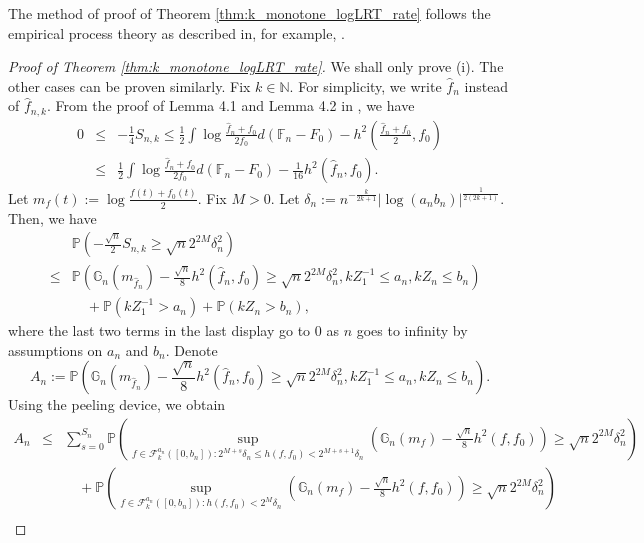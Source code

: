 \documentclass[12pt,letterpaper, twoside, openany]{article}
\theoremstyle{plain}
\begin{document}
The method of proof of Theorem \ref{thm:k_monotone_logLRT_rate} follows the empirical process theory as described in, for example, \cite{van2000empirical}.
\begin{proof}[Proof of Theorem \ref{thm:k_monotone_logLRT_rate}]
We shall only prove (i). The other cases can be proven similarly. Fix $k \in \mathbb{N}$. For simplicity, we write $\hat{f}_n$ instead of $\hat{f}_{n,k}$. From the proof of Lemma 4.1 and Lemma 4.2 in \cite{van2000empirical}, we have
\begin{eqnarray*}
	0 & \leq  &- \frac{1}{4} S_{n, k} \leq \frac{1}{2} \int \log \frac{\hat{f}_{n} + f_0}{2f_0} d (\mathbb{F}_n - F_0) -  h^2 \left( \frac{\hat{f}_n + f_0}{2}, f_0 \right) \\
	& \leq & \frac{1}{2} \int \log \frac{\hat{f}_{n} + f_0}{2f_0} d (\mathbb{F}_n - F_0) - \frac{1}{16} h^2 \left(\hat{f}_n, f_0 \right).
\end{eqnarray*}
Let $m_{f}(t) := \log \frac{f(t) + f_0(t)}{2}$. Fix $M > 0$. Let $\delta_n := n^{-\frac{k}{2k+1}} | \log (a_n b_n)|^{\frac{1}{2(2k+1)}}$. Then, we have
\begin{eqnarray*}
	&& 	\mathbb{P} \left(  - \frac{\sqrt{n}}{2} S_{n, k} \geq \sqrt{n} 2^{2M} \delta^2_n \right) \\
	&\leq & \mathbb{P} \left( \mathbb{G}_n(m_{\hat{f}_n}) - \frac{\sqrt{n}}{8} h^2 ( \hat{f}_n, f_0 ) \geq \sqrt{n} 2^{2M} \delta^2_n, kZ^{-1}_1 \leq a_n, k Z_n \leq b_n \right)  \\
	&& \quad + \mathbb{P}(kZ^{-1}_1 > a_n) + \mathbb{P}(k Z_n > b_n),
\end{eqnarray*}
where the last two terms in the last display go to $0$ as $n$ goes to infinity by assumptions on $a_n$ and $b_n$. Denote
\begin{equation*}
    A_n	 := \mathbb{P} \left( \mathbb{G}_n(m_{\hat{f}_n}) - \frac{\sqrt{n}}{8} h^2 ( \hat{f}_n, f_0 ) \geq \sqrt{n} 2^{2M} \delta^2_n, k Z^{-1}_1 \leq a_n, k Z_n \leq b_n \right).
\end{equation*}
Using the peeling device, we obtain
\begin{eqnarray*}
	A_n	
	& \leq & \sum^{S_n}_{s=0} \mathbb{P}  \left( \sup_{f \in \mathcal{F}^{a_n}_k([0, b_n]): 2^{M+s} \delta_n \leq  h(f, f_0) < 2^{M + s + 1} \delta_n} \left( \mathbb{G}_n(m_f) - \frac{\sqrt{n}}{8} h^2(f, f_0) \right) \geq \sqrt{n} 2^{2M} \delta^2_n \right) \\
	&& \quad + \mathbb{P}  \left( \sup_{f \in \mathcal{F}^{a_n}_k([0, b_n]):   h(f, f_0) < 2^M \delta_n} \left( \mathbb{G}_n(m_f) - \frac{\sqrt{n}}{8} h^2(f, f_0) \right) \geq \sqrt{n} 2^{2M} \delta^2_n \right)\\

\end{eqnarray*}
\end{proof}
\end{document}
